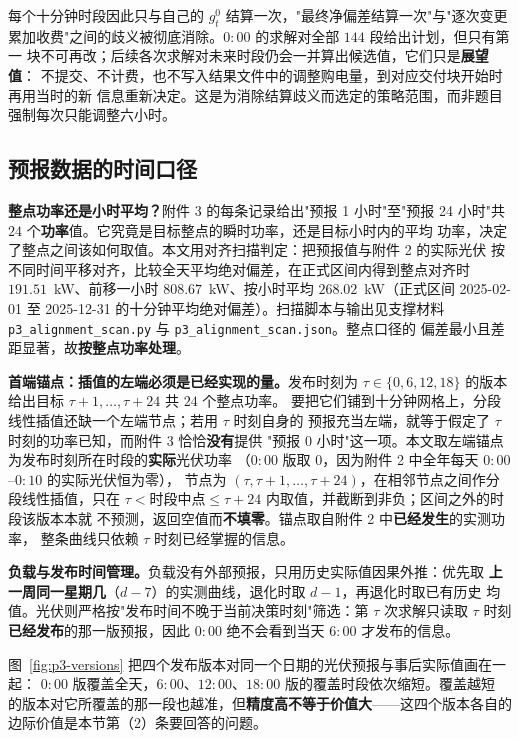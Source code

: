 每个十分钟时段因此只与自己的 $g_t^0$ 结算一次，"最终净偏差结算一次"与"逐次变更
累加收费"之间的歧义被彻底消除。$0{:}00$ 的求解对全部 $144$ 段给出计划，但只有第一
块不可再改；后续各次求解对未来时段仍会一并算出候选值，它们只是\textbf{展望值}：
不提交、不计费，也不写入结果文件中的调整购电量，到对应交付块开始时再用当时的新
信息重新决定。这是为消除结算歧义而选定的策略范围，而非题目强制每次只能调整六小时。

\subsection{预报数据的时间口径}
\label{sec:p3-align}

\textbf{整点功率还是小时平均？}附件 3 的每条记录给出"预报 1 小时"至"预报 24
小时"共 $24$ 个\textbf{功率}值。它究竟是目标整点的瞬时功率，还是目标小时内的平均
功率，决定了整点之间该如何取值。本文用对齐扫描判定：把预报值与附件 2 的实际光伏
按不同时间平移对齐，比较全天平均绝对偏差，在正式区间内得到整点对齐时
$191.51$~kW、前移一小时 $808.67$~kW、按小时平均 $268.02$~kW（正式区间
2025-02-01 至 2025-12-31 的十分钟平均绝对偏差）。扫描脚本与输出见支撑材料
\texttt{p3\_alignment\_scan.py} 与 \texttt{p3\_alignment\_scan.json}。整点口径的
偏差最小且差距显著，故\textbf{按整点功率处理}。

\textbf{首端锚点：插值的左端必须是已经实现的量。}发布时刻为
$\tau\in\{0,6,12,18\}$ 的版本给出目标 $\tau+1,\dots,\tau+24$ 共 $24$ 个整点功率。
要把它们铺到十分钟网格上，分段线性插值还缺一个左端节点；若用 $\tau$ 时刻自身的
预报充当左端，就等于假定了 $\tau$ 时刻的功率已知，而附件 3 恰恰\textbf{没有}提供
"预报 $0$ 小时"这一项。本文取左端锚点为发布时刻所在时段的\textbf{实际}光伏功率
（$0{:}00$ 版取 $0$，因为附件 2 中全年每天 $0{:}00$--$0{:}10$ 的实际光伏恒为零），
节点为 $(\tau,\tau+1,\dots,\tau+24)$，在相邻节点之间作分段线性插值，只在
$\tau<\text{时段中点}\le\tau+24$ 内取值，并截断到非负；区间之外的时段该版本本就
不预测，返回空值而\textbf{不填零}。锚点取自附件 2 中\textbf{已经发生}的实测功率，
整条曲线只依赖 $\tau$ 时刻已经掌握的信息。

\textbf{负载与发布时间管理。}负载没有外部预报，只用历史实际值因果外推：优先取
\textbf{上一周同一星期几}（$d-7$）的实测曲线，退化时取 $d-1$，再退化时取已有历史
均值。光伏则严格按"发布时间不晚于当前决策时刻"筛选：第 $\tau$ 次求解只读取
$\tau$ 时刻\textbf{已经发布}的那一版预报，因此 $0{:}00$ 绝不会看到当天 $6{:}00$
才发布的信息。

图~\ref{fig:p3-versions} 把四个发布版本对同一个日期的光伏预报与事后实际值画在一起：
$0{:}00$ 版覆盖全天，$6{:}00$、$12{:}00$、$18{:}00$ 版的覆盖时段依次缩短。覆盖越短
的版本对它所覆盖的那一段也越准，但\textbf{精度高不等于价值大}——这四个版本各自的
边际价值是本节第（2）条要回答的问题。

